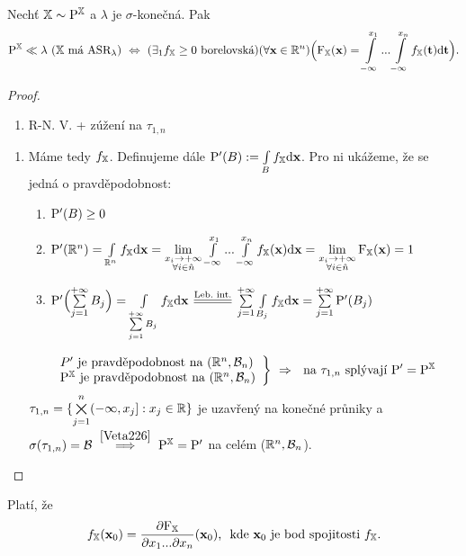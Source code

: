 \begin{theorem}
	Nechť $\mathbb{X}\sim\mathrm{P}^{\mathbb{X}}$ a $\lambda$ je $\sigma$-konečná. Pak 
	$$\mathrm{P}^{\mathbb{X}} \ll  \lambda ~(\mathbb{X}\text{ má ASR}_\lambda) ~\Leftrightarrow ~(\exists_1 f_{\mathbb{X}}\geq 0\text{ borelovská})(\forall \textbf{x}\in\mathbb{R}^n)\Bigl(\mathrm{F}_{\mathbb{X}}(\textbf{x})=\int\limits_{-\infty}^{x_1}...\int\limits_{-\infty}^{x_n}f_{\mathbb{X}}(\textbf{t})\mathrm{d}\textbf{t}\Bigr).$$
	\begin{proof}
		\begin{enumerate}[$\Rightarrow$:]
			\item R-N. V. + zúžení na $\tau_{1,n}$
		\end{enumerate}
	\begin{enumerate}[$\Leftarrow$:]
	\item Máme tedy $f_{\mathbb{X}}$. Definujeme dále $\mathrm{P}'(B):=\int\limits_{B}f_{\mathbb{X}} \mathrm{d}\textbf{x}$. Pro ni ukážeme, že se jedná o pravděpodobnost: \begin{enumerate}[1)]
		\item $\mathrm{P}'(B)\geq0$
		\item $\mathrm{P}'(\mathbb{R}^n)=\int\limits_{\mathbb{R}^n}f_{\mathbb{X}} \mathrm{d}\textbf{x}=\lim\limits_{\substack{x_i \to +\infty \\ \forall i\in\hat{n}}}\int\limits_{-\infty}^{x_1}...\int\limits_{-\infty}^{x_n}f_{\mathbb{X}}(\textbf{x})\mathrm{d}\textbf{x}=\lim\limits_{\substack{x_i \to +\infty \\ \forall i\in\hat{n}}}\mathrm{F}_{\mathbb{X}}(\textbf{x})=1$
		\item $\PP'\Bigl(\sum\limits_{j=1}^{+\infty} B_j\Bigr)=\int\limits_{\sum\limits_{j=1}^{+\infty} B_j}\fex \dif\textbf{x}\equal{\text{Leb.~int.}}\sum\limits_{j=1}^{+\infty} \int\limits_{B_j}\fex \dif\textbf{x}=\sum\limits_{j=1}^{+\infty} \PP'(B_j)$
	\end{enumerate}
\[\left.
\begin{array}{l}
P'\text{ je pravděpodobnost na }(\mathbb{R}^n,\mathcal{B}_n)
\\ 
\mathrm{P}^{\mathbb{X}}\text{ je pravděpodobnost na }(\mathbb{R}^n,\mathcal{B}_n)
\end{array}\right\} ~\Rightarrow~\text{ na }\tau_{1,n}\text{ splývají }\mathrm{P}'=\mathrm{P}^{\mathbb{X}}
\]
$\tau_{1,n}=\{ \bigtimes\limits_{j=1}^n (-\infty,x_j]:x_j\in\mathbb{R} \}$ je uzavřený na konečné průniky a $\sigma(\tau_{1,n})=\mathcal{B}~\stackrel{\ref{Veta226}}{\Longrightarrow}~ \mathrm{P}^{\mathbb{X}} = \mathrm{P}'$ na celém ($\mathbb{R}^n,\mathcal{B}_n$).
\end{enumerate}
	\end{proof}
\end{theorem}
\begin{remark}
Platí, že
$$ f_{\mathbb{X}}(\textbf{x}_0)=\frac{\partial \mathrm{F}_{\mathbb{X}}}{\partial x_1...\partial x_n}(\textbf{x}_0) \text{, ~kde }\textbf{x}_0\text{ je bod spojitosti }f_{\mathbb{X}}. $$
\end{remark}
